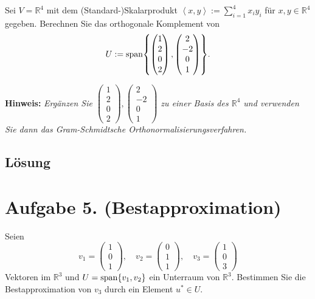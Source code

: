 \documentclass[german,12pt]{homework}
\newcommand{\RR}{\mathbb{R}}
\newcommand{\dotproduct}[2]{\left\langle#1, #2\right\rangle}
\DeclareMathOperator{\vecspan}{span}
\DeclarePairedDelimiter{\penbrace}{\{}{\}}
\begin{document}
    \begin{problem}
        Sei \(V = \RR^4\) mit dem (Standard-)Skalarprodukt \(\dotproduct{x}{y} := \sum_{i = 1}^4x_iy_i\) für \(x, y \in \RR^4\) gegeben. Berechnen Sie das orthogonale Komplement von
        \[U := \vecspan\penbrace*{\begin{pmatrix}1\\2\\0\\2\end{pmatrix}, \begin{pmatrix}2\\-2\\0\\1\end{pmatrix}}.\]

        \textbf{Hinweis:} \emph{Ergänzen Sie \(\begin{pmatrix}1\\2\\0\\2\end{pmatrix}, \begin{pmatrix}2\\-2\\0\\1\end{pmatrix}\) zu einer Basis des \(\RR^4\) und verwenden Sie dann das Gram-Schmidtsche Orthonormalisierungsverfahren.}
    \end{problem}

    \subsection*{Lösung}

    \section*{Aufgabe 5. (Bestapproximation)}

    \begin{problem}
        Seien
        \[v_1 = \begin{pmatrix}1\\0\\1\end{pmatrix}, \quad v_2 = \begin{pmatrix}0\\1\\1\end{pmatrix}, \quad v_3 = \begin{pmatrix}1\\0\\3\end{pmatrix}\]
        Vektoren im \(\RR^3\) und \(U = \vecspan\penbrace*{v_1, v_2}\) ein Unterraum von \(\RR^3\). Bestimmen Sie die Bestapproximation von \(v_3\) durch ein Element \(u^* \in U\).
    \end{problem}
\end{document}
